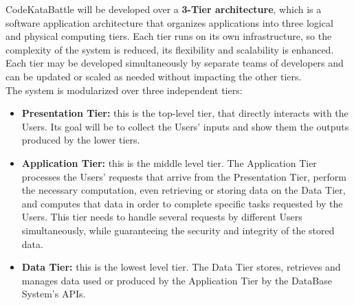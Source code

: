 CodeKataBattle will be developed over a \textbf{3-Tier architecture}, which is a software application architecture that organizes applications into three logical and physical computing tiers. Each tier runs on its own infrastructure, so the complexity of the system is reduced, its flexibility and scalability is enhanced. Each tier may be developed simultaneously by separate teams of developers and can be updated or scaled as needed without impacting the other tiers.
\\
The system is modularized over three independent tiers:
\begin{itemize}
    \item \textbf{Presentation Tier:} this is the top-level tier, that directly interacts with the Users. Its goal will be to collect the Users’ inputs and show them the outputs produced by the lower tiers. 
    \item \textbf{Application Tier:} this is the middle level tier. The Application Tier processes the Users’ requests that arrive from the Presentation Tier, perform the necessary computation, even retrieving or storing data on the Data Tier, and computes that data in order to complete specific tasks requested by the Users. This tier needs to handle several requests by different Users simultaneously, while guaranteeing the security and integrity of the stored data.
    \item \textbf{Data Tier:} this is the lowest level tier. The Data Tier stores, retrieves and manages data used or produced by the Application Tier by the DataBase System’s APIs.
\end{itemize}

